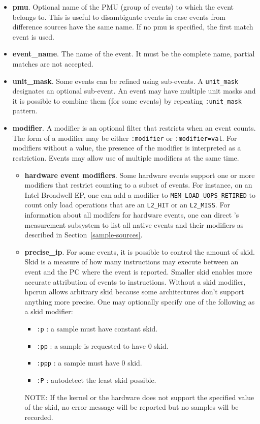 \begin{itemize}
	\item \textbf{pmu}.  Optional name of the PMU (group of events) to which the event belongs to. This is useful to disambiguate events in case events from difference sources have the same name. If no pmu is specified, the first match event is used.
	\item \textbf{event\_name}.  The name of the event. It must be the complete name, partial matches are not accepted. 
	\item \textbf{unit\_mask}.  Some events can be refined using sub-events. A {\tt unit\_mask} designates an optional sub-event.  An event may have multiple unit masks and it is possible to combine them (for some events) by repeating \texttt{:unit\_mask} pattern.
	\item \textbf{modifier}.  A modifier is an optional filter that restricts when an event counts.
                The form of a  modifier may be either \texttt{:modifier} or \texttt{:modifier=val}.
		For modifiers without a value, the presence of the modifier is 
                interpreted as a restriction. Events may allow use of multiple modifiers 
                at the same time.
		\begin{itemize}
		\item \textbf{hardware event modifiers}. Some hardware events support one or more modifiers that restrict counting to a subset of events. For instance, on an Intel Broadwell EP, one can add a modifier to \verb|MEM_LOAD_UOPS_RETIRED| to count only load operations that are 
an \verb|L2_HIT| or an \verb|L2_MISS|. For information about all modifers for hardware events, 
one can direct \HPCToolkit{}'s measurement subsystem to list all native events and their modifiers 
as described in Section~\ref{sample-sources}. 
		\item \textbf{precise\_ip}. For some events, it is possible to control the amount of skid. 
Skid is a measure of how many instructions may execute between an event and the PC where the event is reported. 
Smaller skid enables more accurate attribution of events to instructions. Without a skid modifier, hpcrun allows arbitrary skid because some architectures 
don't support anything more precise.  One may optionally specify one of the following as a skid modifier:
			\begin{itemize}
				\item \verb|:p| : a sample must have constant skid.
				\item \verb|:pp| :  a sample is requested to have 0 skid.
				\item \verb|:ppp| : a sample must have 0 skid.  
				\item \verb|:P| : autodetect the least skid possible.
			\end{itemize}
			NOTE: If the kernel or the hardware does not support the specified value of the skid, no error message will be reported 
but no samples will be recorded.
	\end{itemize}
\end{itemize}


